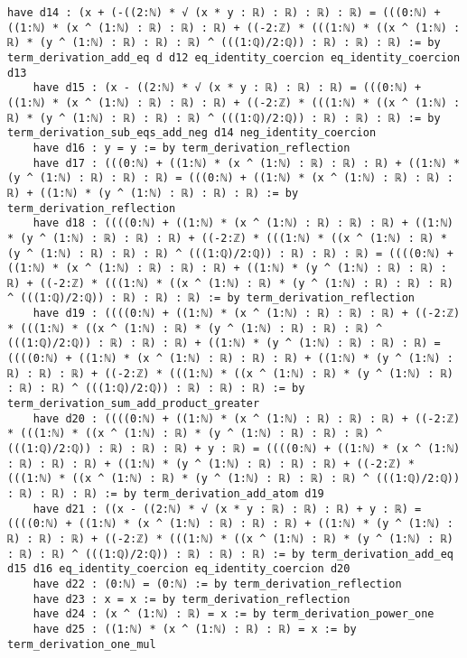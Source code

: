\documentclass{article}
\begin{document}
\begin{tcolorbox}[colback=white!10, width=\linewidth]
\begin{lstlisting}[language=Lean4]
    have d14 : (x + (-((2:ℕ) * √ (x * y : ℝ) : ℝ) : ℝ) : ℝ) = (((0:ℕ) + ((1:ℕ) * (x ^ (1:ℕ) : ℝ) : ℝ) : ℝ) + ((-2:ℤ) * (((1:ℕ) * ((x ^ (1:ℕ) : ℝ) * (y ^ (1:ℕ) : ℝ) : ℝ) : ℝ) ^ (((1:ℚ)/2:ℚ)) : ℝ) : ℝ) : ℝ) := by term_derivation_add_eq d d12 eq_identity_coercion eq_identity_coercion d13
    have d15 : (x - ((2:ℕ) * √ (x * y : ℝ) : ℝ) : ℝ) = (((0:ℕ) + ((1:ℕ) * (x ^ (1:ℕ) : ℝ) : ℝ) : ℝ) + ((-2:ℤ) * (((1:ℕ) * ((x ^ (1:ℕ) : ℝ) * (y ^ (1:ℕ) : ℝ) : ℝ) : ℝ) ^ (((1:ℚ)/2:ℚ)) : ℝ) : ℝ) : ℝ) := by term_derivation_sub_eqs_add_neg d14 neg_identity_coercion
    have d16 : y = y := by term_derivation_reflection
    have d17 : (((0:ℕ) + ((1:ℕ) * (x ^ (1:ℕ) : ℝ) : ℝ) : ℝ) + ((1:ℕ) * (y ^ (1:ℕ) : ℝ) : ℝ) : ℝ) = (((0:ℕ) + ((1:ℕ) * (x ^ (1:ℕ) : ℝ) : ℝ) : ℝ) + ((1:ℕ) * (y ^ (1:ℕ) : ℝ) : ℝ) : ℝ) := by term_derivation_reflection
    have d18 : ((((0:ℕ) + ((1:ℕ) * (x ^ (1:ℕ) : ℝ) : ℝ) : ℝ) + ((1:ℕ) * (y ^ (1:ℕ) : ℝ) : ℝ) : ℝ) + ((-2:ℤ) * (((1:ℕ) * ((x ^ (1:ℕ) : ℝ) * (y ^ (1:ℕ) : ℝ) : ℝ) : ℝ) ^ (((1:ℚ)/2:ℚ)) : ℝ) : ℝ) : ℝ) = ((((0:ℕ) + ((1:ℕ) * (x ^ (1:ℕ) : ℝ) : ℝ) : ℝ) + ((1:ℕ) * (y ^ (1:ℕ) : ℝ) : ℝ) : ℝ) + ((-2:ℤ) * (((1:ℕ) * ((x ^ (1:ℕ) : ℝ) * (y ^ (1:ℕ) : ℝ) : ℝ) : ℝ) ^ (((1:ℚ)/2:ℚ)) : ℝ) : ℝ) : ℝ) := by term_derivation_reflection
    have d19 : ((((0:ℕ) + ((1:ℕ) * (x ^ (1:ℕ) : ℝ) : ℝ) : ℝ) + ((-2:ℤ) * (((1:ℕ) * ((x ^ (1:ℕ) : ℝ) * (y ^ (1:ℕ) : ℝ) : ℝ) : ℝ) ^ (((1:ℚ)/2:ℚ)) : ℝ) : ℝ) : ℝ) + ((1:ℕ) * (y ^ (1:ℕ) : ℝ) : ℝ) : ℝ) = ((((0:ℕ) + ((1:ℕ) * (x ^ (1:ℕ) : ℝ) : ℝ) : ℝ) + ((1:ℕ) * (y ^ (1:ℕ) : ℝ) : ℝ) : ℝ) + ((-2:ℤ) * (((1:ℕ) * ((x ^ (1:ℕ) : ℝ) * (y ^ (1:ℕ) : ℝ) : ℝ) : ℝ) ^ (((1:ℚ)/2:ℚ)) : ℝ) : ℝ) : ℝ) := by term_derivation_sum_add_product_greater
    have d20 : ((((0:ℕ) + ((1:ℕ) * (x ^ (1:ℕ) : ℝ) : ℝ) : ℝ) + ((-2:ℤ) * (((1:ℕ) * ((x ^ (1:ℕ) : ℝ) * (y ^ (1:ℕ) : ℝ) : ℝ) : ℝ) ^ (((1:ℚ)/2:ℚ)) : ℝ) : ℝ) : ℝ) + y : ℝ) = ((((0:ℕ) + ((1:ℕ) * (x ^ (1:ℕ) : ℝ) : ℝ) : ℝ) + ((1:ℕ) * (y ^ (1:ℕ) : ℝ) : ℝ) : ℝ) + ((-2:ℤ) * (((1:ℕ) * ((x ^ (1:ℕ) : ℝ) * (y ^ (1:ℕ) : ℝ) : ℝ) : ℝ) ^ (((1:ℚ)/2:ℚ)) : ℝ) : ℝ) : ℝ) := by term_derivation_add_atom d19
    have d21 : ((x - ((2:ℕ) * √ (x * y : ℝ) : ℝ) : ℝ) + y : ℝ) = ((((0:ℕ) + ((1:ℕ) * (x ^ (1:ℕ) : ℝ) : ℝ) : ℝ) + ((1:ℕ) * (y ^ (1:ℕ) : ℝ) : ℝ) : ℝ) + ((-2:ℤ) * (((1:ℕ) * ((x ^ (1:ℕ) : ℝ) * (y ^ (1:ℕ) : ℝ) : ℝ) : ℝ) ^ (((1:ℚ)/2:ℚ)) : ℝ) : ℝ) : ℝ) := by term_derivation_add_eq d15 d16 eq_identity_coercion eq_identity_coercion d20
    have d22 : (0:ℕ) = (0:ℕ) := by term_derivation_reflection
    have d23 : x = x := by term_derivation_reflection
    have d24 : (x ^ (1:ℕ) : ℝ) = x := by term_derivation_power_one
    have d25 : ((1:ℕ) * (x ^ (1:ℕ) : ℝ) : ℝ) = x := by term_derivation_one_mul

\end{lstlisting}
\end{tcolorbox}
\end{document}
